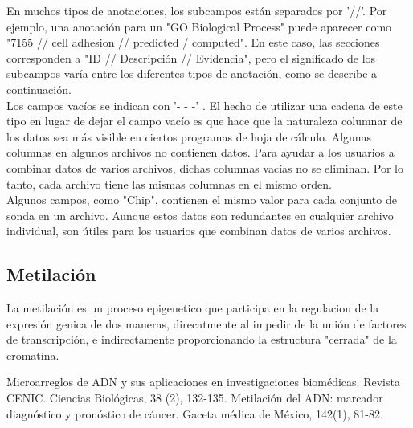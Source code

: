 \documentclass[12pt,letterpaper]{article}
\begin{document}
En muchos tipos de anotaciones, los subcampos están separados por '//'. Por ejemplo,  una anotación para un "GO Biological Process" puede aparecer como "7155 // cell adhesion // predicted / computed".  En este caso, las secciones corresponden a "ID // Descripción // Evidencia", pero el significado de los subcampos varía entre los diferentes tipos de anotación, como se describe a continuación.\\

Los campos vacíos se indican con '- - -' . El hecho de utilizar una cadena de este tipo en lugar de dejar el campo vacío es que hace que la naturaleza columnar de los datos sea más visible en ciertos programas de hoja de cálculo.
Algunas columnas en algunos archivos no contienen datos. Para ayudar a los usuarios a combinar datos de varios archivos, dichas columnas vacías no se eliminan. Por lo tanto, cada archivo tiene las mismas columnas en el mismo orden.\\

Algunos campos, como "Chip", contienen el mismo valor para cada conjunto de sonda en un archivo. Aunque estos datos son redundantes en cualquier archivo individual, son útiles para los usuarios que combinan datos de varios archivos.
\subsection{Metilación}
La metilación es un proceso epigenetico que participa en la regulacion de la expresión genica de dos maneras, direcatmente al impedir de la unión de factores de transcripción, e indirectamente proporcionando la estructura "cerrada" de la cromatina\cite{Mesa-Cornejo, Viviana Matilde, Barros-Núñez, Patricio, & Medina-Lozano, Claudina2006}.

\begin{thebibliography}{XXX0000}
   Microarreglos de ADN y sus aplicaciones en investigaciones biomédicas. Revista CENIC. Ciencias Biológicas, 38 (2), 132-135. 
   Metilación del ADN: marcador diagnóstico y pronóstico de cáncer. Gaceta médica de México, 142(1), 81-82. 
\end{thebibliography} 	
\end{document}
